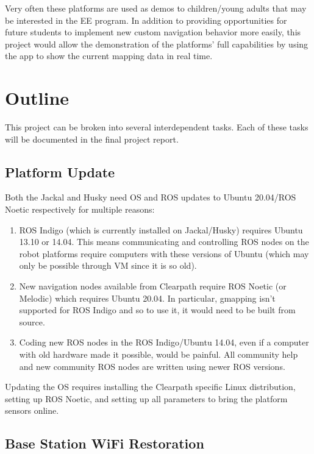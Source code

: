 \documentclass{article}
\begin{document}
\vspace{5mm}
\noindent
Very often these platforms are used as demos to children/young adults that may be interested in the EE program. In addition to providing
opportunities for future students to implement new custom navigation behavior more easily, this project would allow the demonstration of the platforms' full
capabilities by using the app to show the current mapping data in real time.

\newpage
\section{Outline}

This project can be broken into several interdependent tasks. Each of these tasks will be documented in the final project report.

\subsection{Platform Update}

Both the Jackal and Husky need OS and ROS updates to Ubuntu 20.04/ROS Noetic respectively for multiple reasons:

\begin{enumerate}
    \item ROS Indigo (which is currently installed on Jackal/Husky) requires Ubuntu 13.10 or 14.04. This means communicating and controlling ROS nodes on 
    the robot platforms require computers with these versions of Ubuntu (which may only be possible through VM since it is so old).
    
    \item New navigation nodes available from Clearpath require ROS Noetic (or Melodic) which requires Ubuntu 20.04. In particular, gmapping isn't supported for ROS
    Indigo and so to use it, it would need to be built from source.
    
    \item Coding new ROS nodes in the ROS Indigo/Ubuntu 14.04, even if a computer with old hardware made it possible, would be painful. 
    All community help and new community ROS nodes are written using newer ROS versions.
\end{enumerate}

\noindent
Updating the OS requires installing the Clearpath specific Linux distribution, setting up ROS Noetic, and setting up all parameters to bring the platform sensors online.

\subsection{Base Station WiFi Restoration}
\end{document}

